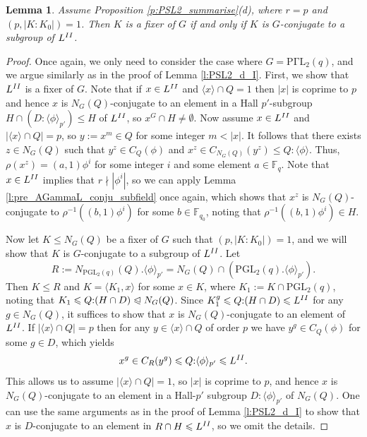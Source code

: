 \documentclass[twoside,a4paper,reqno,11pt]{amsart}
\newcommand{\normeq}{\trianglelefteqslant}
\newcommand{\<}{\langle}
\renewcommand{\>}{\rangle}
\newcommand{\la}{\langle}
\newcommand{\ra}{\rangle}
\newcommand{\leqs}{\leqslant}
\newcommand{\PGL}{\mathrm{PGL}}
\newcommand{\PGammaL}{\mathrm{P\Gamma L}}
\newtheorem{lem}[thm]{Lemma}
\theoremstyle{definition}
\begin{document}
	
	
	
	
	\begin{lem}
		\label{l:PSL2_d_II}
		Assume Proposition \ref{p:PSL2_summarise}(d), where $r = p$ and $(p,|K:K_0|) = 1$. Then $K$ is a fixer of $G$ if and only if $K$ is $G$-conjugate to a subgroup of $L^{\rm II}$.
	\end{lem}
	
	\begin{proof}
		Once again, we only need to consider the case where $G = \PGammaL_2(q)$, and we argue similarly as in the proof of Lemma \ref{l:PSL2_d_I}. First, we show that $L^{\rm II}$ is a fixer of $G$. Note that if $x\in L^{\rm II}$ and $\la x\ra\cap Q = 1$ then $|x|$ is coprime to $p$ and hence $x$ is $N_G(Q)$-conjugate to an element in a Hall $p'$-subgroup $H\cap (D{:}\la\phi\ra_{p'})\leqs H$ of $L^{\rm{II}}$, so $x^G\cap H\ne \emptyset$. Now assume $x\in L^{\rm II}$ and $|\la x\ra\cap Q| = p$, so $y:=x^m\in Q$ for some integer $m < |x|$. It follows that there exists $z\in N_G(Q)$ such that $y^z\in C_Q(\phi)$ and $x^z\in C_{N_G(Q)}(y^z)\leqs Q{:}\la\phi\ra$. Thus, $\rho(x^z) = (a,1)\phi^i$ for some integer $i$ and some element $a\in\mathbb{F}_q$. Note that $x\in L^{\rm II}$ implies that $r\nmid |\phi^i|$, so we can apply Lemma \ref{l:pre_AGammaL_conju_subfield} once again, which shows that $x^z$ is $N_G(Q)$-conjugate to $\rho^{-1}((b,1)\phi^i)$ for some $b\in\mathbb{F}_{q_0}$, noting that $\rho^{-1}((b,1)\phi^i)\in H$.
		
		Now let $K\leqs N_G(Q)$ be a fixer of $G$ such that $(p,|K:K_0|) = 1$, and we will show that $K$ is $G$-conjugate to a subgroup of $L^{\rm II}$. Let
		\begin{equation*}
		R:=N_{\PGL_2(q)}(Q).\la\phi\ra_{p'}= N_G(Q)\cap (\PGL_2(q).\la\phi\ra_{p'}).
		\end{equation*}
		Then $K\leqs R$ and $K = \la K_1,x\ra$ for some $x\in K$, where $K_1 := K\cap \PGL_2(q)$, noting that $K_1\leqs Q{:}(H\cap D)\normeq N_G(Q)$. Since $K_1^g\leqs Q{:}(H\cap D)\leqs L^{\rm II}$ for any $g\in N_G(Q)$, it suffices to show that $x$ is $N_G(Q)$-conjugate to an element of $L^{\rm II}$. If $|\la x\ra\cap Q| = p$ then for any $y\in\la x\ra\cap Q$ of order $p$ we have $y^g\in C_Q(\phi)$ for some $g\in D$, which yields
		\begin{equation*}
		x^g\in C_R(y^g)\leqs Q{:}\la\phi\ra_{p'}\leqs L^{\rm II}.
		\end{equation*}
		This allows us to assume $|\la x\ra\cap Q| = 1$, so $|x|$ is coprime to $p$, and hence $x$ is $N_G(Q)$-conjugate to an element in a Hall-$p'$ subgroup $D{:}\la\phi\ra_{p'}$ of $N_G(Q)$. One can use the same arguments as in the proof of Lemma \ref{l:PSL2_d_I} to show that $x$ is $D$-conjugate to an element in $R\cap H\leqs L^{\rm II}$, so we omit the details.
	\end{proof}
	
\end{document}
